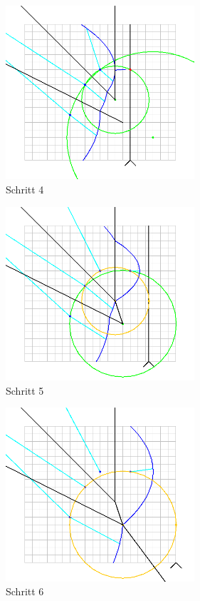 \begin{figure}[h]
\begin{center}
\includegraphics[width=7cm]{capture4}
\end{center}
\caption{Schritt 4}
\label{fig:c4}
\end{figure}

\begin{figure}[h]
\begin{center}
\includegraphics[width=7cm]{capture5}
\end{center}
\caption{Schritt 5}
\label{fig:c5}
\end{figure}

\begin{figure}[h]
\begin{center}
\includegraphics[width=7cm]{capture6}
\end{center}
\caption{Schritt 6}
\label{fig:c6}
\end{figure}

